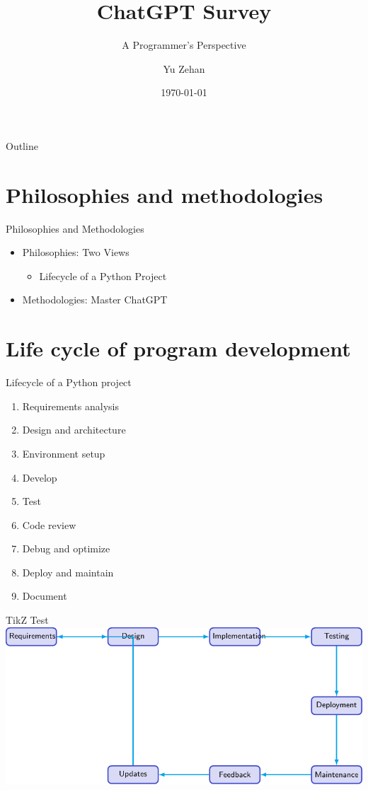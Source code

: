 \documentclass{beamer}
\title{ChatGPT Survey}
\subtitle{A Programmer's Perspective}
\author{Yu Zehan}
\institute{Intel FLEX}
\date{\today}
\begin{document}
\begin{frame}
  \titlepage
\end{frame}

\begin{frame}{Outline}
  \tableofcontents
\end{frame}

\section{Philosophies and methodologies}
\begin{frame}{Philosophies and Methodologies}
  \begin{itemize}
    \item Philosophies: Two Views
    \begin{itemize}
      \item Lifecycle of a Python Project
    \end{itemize}
    \item Methodologies: Master ChatGPT
  \end{itemize}
\end{frame}

\section{Life cycle of program development}
\begin{frame}{Lifecycle of a Python project}
  \begin{enumerate}
  \item Requirements analysis
  \item Design and architecture
  \item Environment setup
  \item Develop
  \item Test
  \item Code review
  \item Debug and optimize
  \item Deploy and maintain
  \item Document
\end{enumerate}
\end{frame}

\begin{frame}{TikZ Test}
  \includegraphics[width=\textwidth,height=0.8\textheight,keepaspectratio]{tikz-code-lifecycle.pdf}
\end{frame}
\end{document}
